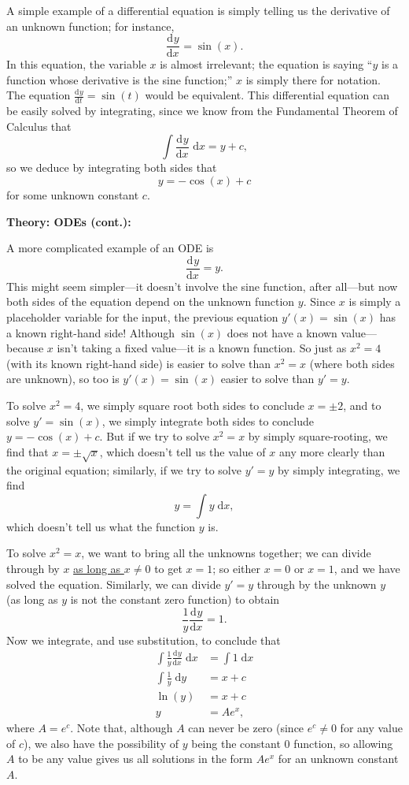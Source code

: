 \documentclass{article}
\newcommand{\deriv}[3][]{\frac{\mathrm{d}^{#1}#2}{\mathrm{d}#3^{#1}}}
\newcommand{\diff}{\;\mathrm{d}}
\begin{document}
A simple example of a differential equation is simply telling us the derivative of an unknown function; for instance,
\[\deriv{y}{x}=\sin(x).\]
In this equation, the variable $x$ is almost irrelevant; the equation is saying ``$y$ is a function whose derivative is the sine function;'' $x$ is simply there for notation. The equation $\deriv{y}{t}=\sin(t)$ would be equivalent. This differential equation can be easily solved by integrating, since we know from the Fundamental Theorem of Calculus that
\[\int \deriv{y}{x}\diff x=y+c,\]
so we deduce by integrating both sides that
\[y=-\cos(x)+c\]
for some unknown constant $c$.








\clearpage




\textbf{Theory: ODEs (cont.):}\bigskip


A more complicated example of an ODE is
\[\deriv{y}{x}=y.\]
This might seem simpler---it doesn't involve the sine function, after all---but now both sides of the equation depend on the unknown function $y$. Since $x$ is simply a placeholder variable for the input, the previous equation $y'(x)=\sin(x)$ has a known right-hand side! Although $\sin(x)$ does not have a known value---because $x$ isn't taking a fixed value---it is a known function. So just as $x^2=4$ (with its known right-hand side) is easier to solve than $x^2=x$ (where both sides are unknown), so too is $y'(x)=\sin(x)$ easier to solve than $y'=y$.

To solve $x^2=4$, we simply square root both sides to conclude $x=\pm 2$, and to solve $y'=\sin(x)$, we simply integrate both sides to conclude $y=-\cos(x)+c$. But if we try to solve $x^2=x$ by simply square-rooting, we find that $x=\pm\sqrt{x}$, which doesn't tell us the value of $x$ any more clearly than the original equation; similarly, if we try to solve $y'=y$ by simply integrating, we find
\[y=\int y\diff x,\]
which doesn't tell us what the function $y$ is.

To solve $x^2=x$, we want to bring all the unknowns together; we can divide through by $x$ \underline{as long as $x\neq 0$} to get $x=1$; so either $x=0$ or $x=1$, and we have solved the equation. Similarly, we can divide $y'=y$ through by the unknown $y$ (as long as $y$ is not the constant zero function) to obtain
\[\frac{1}{y}\deriv{y}{x}=1.\]
Now we integrate, and use substitution, to conclude that
\begin{align*}
	\int \frac{1}{y}\deriv{y}{x}\diff x &= \int 1\diff x\\
	\int \frac{1}{y}\diff y &= x+c\\
	\ln(y)&=x+c\\
	y&=Ae^x,
\end{align*}
where $A=e^c$. Note that, although $A$ can never be zero (since $e^c\neq 0$ for any value of $c$), we also have the possibility of $y$ being the constant 0 function, so allowing $A$ to be any value gives us all solutions in the form $Ae^x$ for an unknown constant $A$.
\end{document}
